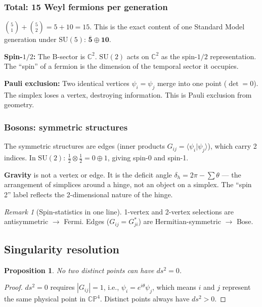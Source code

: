 \documentclass[12pt]{article}
\newtheorem{proposition}[theorem]{Proposition}
\theoremstyle{remark}
\newtheorem{remark}[theorem]{Remark}
\theoremstyle{definition}
\begin{document}
\subsubsection{Total: 15 Weyl fermions per generation}

$\binom{5}{1} + \binom{5}{2} = 5 + 10 = 15$. This is the exact content of one Standard Model generation under $\text{SU}(5)$: $\bar{\mathbf{5}} \oplus \mathbf{10}$.

\textbf{Spin-$1/2$:} The B-sector is $\mathbb{C}^2$. $\text{SU}(2)$ acts on $\mathbb{C}^2$ as the spin-$1/2$ representation. The ``spin'' of a fermion is the dimension of the temporal sector it occupies.

\textbf{Pauli exclusion:} Two identical vertices $\psi_i = \psi_j$ merge into one point ($\det = 0$). The simplex loses a vertex, destroying information. This is Pauli exclusion from geometry.

\subsubsection{Bosons: symmetric structures}

The symmetric structures are edges (inner products $G_{ij} = \langle\psi_i|\psi_j\rangle$), which carry 2 indices. In $\text{SU}(2)$: $\frac{1}{2} \otimes \frac{1}{2} = 0 \oplus 1$, giving spin-0 and spin-1.

\textbf{Gravity} is not a vertex or edge. It is the deficit angle $\delta_h = 2\pi - \sum\theta$ --- the arrangement of simplices around a hinge, not an object on a simplex. The ``spin 2'' label reflects the 2-dimensional nature of the hinge.

\begin{remark}[Spin-statistics in one line]
1-vertex and 2-vertex selections are antisymmetric $\to$ Fermi. Edges ($G_{ij} = G_{ji}^*$) are Hermitian-symmetric $\to$ Bose.
\end{remark}

\subsection{Singularity resolution}

\begin{proposition}
No two distinct points can have $ds^2 = 0$.
\end{proposition}

\begin{proof}
$ds^2 = 0$ requires $|G_{ij}| = 1$, i.e., $\psi_i = e^{i\theta}\psi_j$, which means $i$ and $j$ represent the same physical point in $\mathbb{CP}^4$. Distinct points always have $ds^2 > 0$.
\end{proof}
\end{document}
